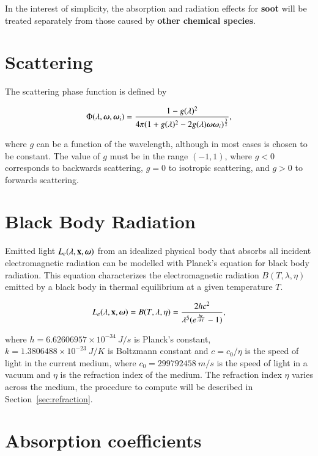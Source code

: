 In the interest of simplicity, the absorption and radiation effects for \textbf{soot} will be treated separately from those caused by \textbf{other chemical species}.

\section{Scattering}
\label{sec:scattering}

The scattering phase function is defined by

\begin{equation}
\Phi (\lambda, \boldsymbol{\omega}, \boldsymbol{\omega}_i) = \frac{1 - g(\lambda)^2}{4 \pi(1 + g(\lambda)^2 - 2 g(\lambda) \boldsymbol{\omega} \boldsymbol{\omega}_i)^{\frac{3}{2}}},
\end{equation}

where $g$ can be a function of the wavelength, although in most cases is chosen to be constant.
The value of $g$ must be in the range $(-1, 1)$, where $g < 0$ corresponds to backwards scattering, $g = 0$ to isotropic scattering, and $g > 0$ to forwards scattering.

\section{Black Body Radiation}
\label{sec:black_body_radiation}

Emitted light $L_e(\lambda, \mathbf{x}, \boldsymbol{\omega})$ from an idealized physical body that absorbs all incident electromagnetic radiation can be modelled with Planck's equation for black body radiation.
This equation characterizes the electromagnetic radiation $B(T, \lambda, \eta)$ emitted by a black body in thermal equilibrium at a given temperature $T$.

\begin{equation}
L_e(\lambda, \mathbf{x}, \boldsymbol{\omega}) = B(T, \lambda, \eta) = \frac{2 h c^2}{\lambda^5  (e ^\frac{h c}{\lambda k T} - 1)},
\end{equation}

where $h = 6.62606957 \times 10^{-34}~J/s$ is Planck's constant, $k = 1.3806488 \times 10^{-23}~J/K$ is Boltzmann constant and $c =  c_0 / \eta$ is the speed of light in the current medium, where $c_0 = 299792458~m/s$ is the speed of light in a vacuum and $\eta$ is the refraction index of the medium.
The refraction index $\eta$ varies across the medium, the procedure to compute will be described in Section~\ref{sec:refraction}.

\section{Absorption coefficients}
\label{sec:absorption_coefficients}

